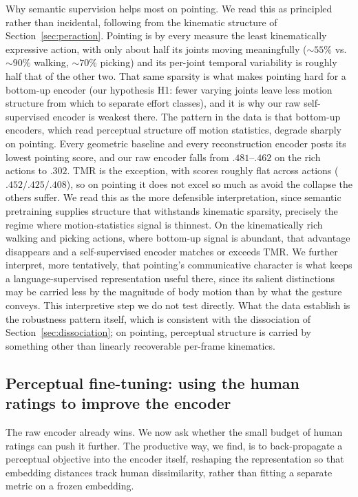 \documentclass[letterpaper]{article} %
\begin{document}
{Why semantic supervision helps most on pointing.} We read this as principled rather than
incidental, following from the kinematic structure of Section~\ref{sec:peraction}. Pointing is by every measure the
{least kinematically expressive} action, with only about half its joints moving meaningfully
($\sim$$55\%$ vs.\ $\sim$$90\%$ walking, $\sim$$70\%$ picking) and its per-joint temporal variability
is roughly half that of the other two. That same sparsity is what makes pointing hard for a
{bottom-up} encoder (our hypothesis H1: fewer varying joints leave less motion structure from
which to separate effort classes), and it is why our raw self-supervised encoder is weakest there. The
pattern in the data is that {bottom-up} encoders, which read perceptual structure off motion
statistics, degrade sharply on pointing. Every geometric baseline and every reconstruction encoder
posts its lowest pointing score, and our raw encoder falls from $.481$--$.462$ on the rich actions to
$.302$. TMR is the exception, with scores roughly {flat} across actions ($.452/.425/.408$), so on
pointing it does not excel so much as avoid the collapse the others suffer. We read this as the more
defensible interpretation, since semantic pretraining supplies structure that withstands kinematic
sparsity, precisely the regime where motion-statistics signal is thinnest. On the kinematically rich
walking and picking actions, where bottom-up signal is abundant, that advantage disappears and a
self-supervised encoder matches or exceeds TMR. We further interpret, more tentatively, that pointing's
communicative character is what keeps a language-supervised representation useful there, since its
salient distinctions may be carried less by the magnitude of body motion than by what the gesture
conveys. This interpretive step we do not test directly. What the data establish is the robustness
pattern itself, which is consistent with the dissociation of Section~\ref{sec:dissociation}; on pointing,
perceptual structure is carried by something other than linearly recoverable per-frame kinematics.

\subsection{Perceptual fine-tuning: using the human ratings to improve the encoder}
\label{sec:finetune}
The raw encoder already wins. We now ask whether the small budget of human ratings can push it
further. The productive way, we find, is to back-propagate a perceptual objective {into the
encoder itself}, reshaping the representation so that embedding distances track human
dissimilarity, rather than fitting a separate metric on a frozen embedding.
\end{document}
